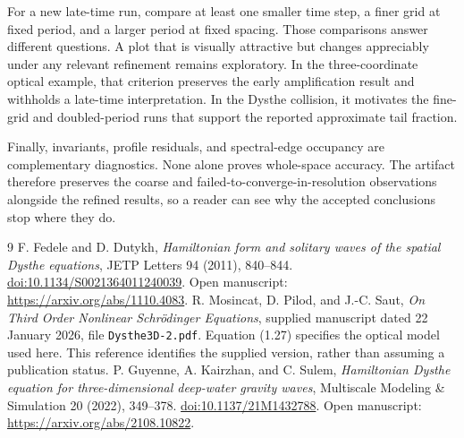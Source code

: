 \documentclass[10pt,letterpaper]{article}
\numberwithin{equation}{section}
\begin{document}
For a new late-time run, compare at least one smaller time step, a finer grid at fixed period, and a larger period at fixed spacing. Those comparisons answer different questions. A plot that is visually attractive but changes appreciably under any relevant refinement remains exploratory. In the three-coordinate optical example, that criterion preserves the early amplification result and withholds a late-time interpretation. In the Dysthe collision, it motivates the fine-grid and doubled-period runs that support the reported approximate tail fraction.

Finally, invariants, profile residuals, and spectral-edge occupancy are complementary diagnostics. None alone proves whole-space accuracy. The artifact therefore preserves the coarse and failed-to-converge-in-resolution observations alongside the refined results, so a reader can see why the accepted conclusions stop where they do.

\begin{thebibliography}{9}
 F. Fedele and D. Dutykh, \emph{Hamiltonian form and solitary waves of the spatial Dysthe equations}, JETP Letters 94 (2011), 840--844.
\href{https://doi.org/10.1134/S0021364011240039}{doi:10.1134/S0021364011240039}.
Open manuscript: \url{https://arxiv.org/abs/1110.4083}.
 R. Mosincat, D. Pilod, and J.-C. Saut, \emph{On Third Order Nonlinear Schr\"odinger Equations}, supplied manuscript dated 22 January 2026, file \texttt{Dysthe3D-2.pdf}. Equation (1.27) specifies the optical model used here. This reference identifies the supplied version, rather than assuming a publication status.
 P. Guyenne, A. Kairzhan, and C. Sulem, \emph{Hamiltonian Dysthe equation for three-dimensional deep-water gravity waves}, Multiscale Modeling \& Simulation 20 (2022), 349--378.
\href{https://doi.org/10.1137/21M1432788}{doi:10.1137/21M1432788}.
Open manuscript: \url{https://arxiv.org/abs/2108.10822}.
\end{thebibliography}
\end{document}
